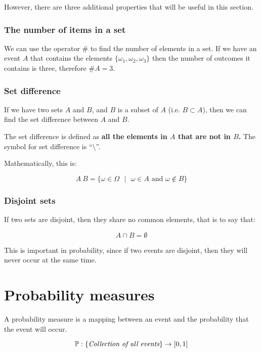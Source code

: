However, there are three additional properties that will be useful in this
section.

\subsubsection{The number of items in a set}

We can use the operator $\#$ to find the number of elements in a set. If we have
an event $A$ that contains the elements $\{\omega_1, \omega_2, \omega_3\}$ then
the number of outcomes it contains is three, therefore $\#A = 3$.

\subsubsection{Set difference}

If we have two sets $A$ and $B$, and $B$ is a subset of $A$ (i.e. $B \subset
A$), then we can find the set difference between $A$ and $B$.

The set difference is defined as {\bf all the elements in $A$ that are not in
$B$.} The symbol for set difference is ``$\setminus$''.

Mathematically, this is:

\begin{dmath*}
	{A \ B = \{\omega \in \Omega \textrm{ } \vert \textrm{ } \omega \in A \textrm{ and } \omega \not\in B\}}
\end{dmath*}

\subsubsection{Disjoint sets}

If two sets are disjoint, then they share no common elements, that is to say
that:

\begin{dmath*}
	A \cap B = \emptyset
\end{dmath*}

This is important in probability, since if two events are disjoint, then they
will never occur at the same time.

\section{Probability measures}

A probability measure is a mapping between an event and the probability that the
event will occur.

\begin{dmath*}
	\mathbb{P} : \{\textrm{\it Collection of all events}\} \rightarrow [0,1]
\end{dmath*}

